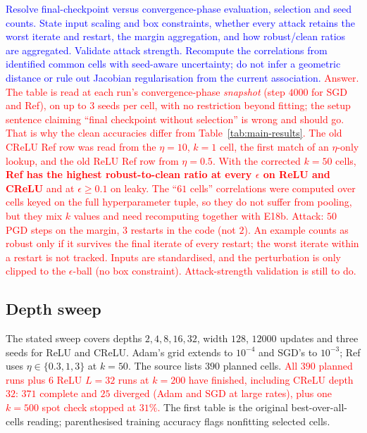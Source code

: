 \documentclass{article}
\newcommand{\zied}[1]{\textcolor{blue}{#1}}
\newcommand{\nat}[1]{\textcolor{red}{#1}}
\theoremstyle{definition}
\theoremstyle{remark}
\begin{document}
\zied{Resolve final-checkpoint versus convergence-phase evaluation, selection and seed counts. State input scaling and box constraints, whether every attack retains the worst iterate and restart, the margin aggregation, and how robust/clean ratios are aggregated. Validate attack strength. Recompute the correlations from identified common cells with seed-aware uncertainty; do not infer a geometric distance or rule out Jacobian regularisation from the current association.}
\nat{Answer. The table is read at each run's convergence-phase \emph{snapshot} (step $4000$ for SGD and Ref), on up to $3$ seeds per cell, with no restriction beyond fitting; the setup sentence claiming ``final checkpoint without selection'' is wrong and should go. That is why the clean accuracies differ from Table~\ref{tab:main-results}. The old CReLU Ref row was read from the $\eta=10$, $k=1$ cell, the first match of an $\eta$-only lookup, and the old ReLU Ref row from $\eta=0.5$. With the corrected $k=50$ cells, \textbf{Ref has the highest robust-to-clean ratio at every $\epsilon$ on ReLU and CReLU} and at $\epsilon\ge0.1$ on leaky. The ``$61$ cells'' correlations were computed over cells keyed on the full hyperparameter tuple, so they do not suffer from pooling, but they mix $k$ values and need recomputing together with E18b. Attack: $50$ PGD steps on the margin, $3$ restarts in the code (not $2$). An example counts as robust only if it survives the final iterate of every restart; the worst iterate within a restart is not tracked. Inputs are standardised, and the perturbation is only clipped to the $\epsilon$-ball (no box constraint). Attack-strength validation is still to do.}

\subsection{Depth sweep}\label{app:e17}

The stated sweep covers depths $2,4,8,16,32$, width $128$, $12000$ updates and three seeds for ReLU and CReLU. Adam's grid extends to $10^{-4}$ and SGD's to $10^{-3}$; Ref uses $\eta\in\{0.3,1,3\}$ at $k=50$. The source lists $390$ planned cells. \nat{All $390$ planned runs plus $6$ ReLU $L=32$ runs at $k=200$ have finished, including CReLU depth $32$: $371$ complete and $25$ diverged (Adam and SGD at large rates), plus one $k=500$ spot check stopped at $31\%$.} The first table is the original best-over-all-cells reading; parenthesised training accuracy flags nonfitting selected cells.
\end{document}
